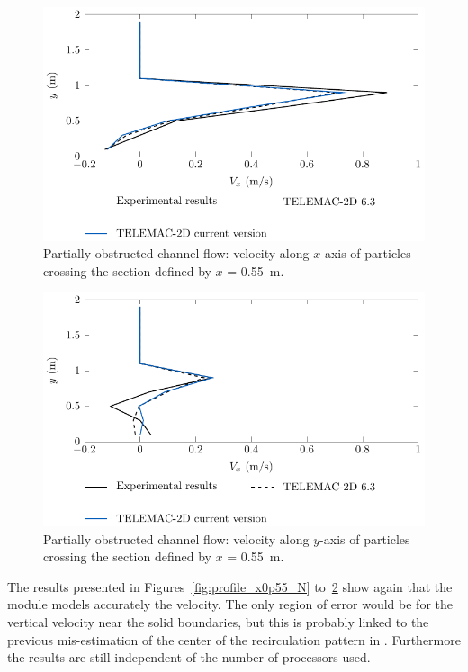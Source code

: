\begin{figure}[h!]
\begin{center}
  \includegraphics[]{./img/CanalAlgProfile_x0p55_Vx}
\end{center}
\caption{Partially obstructed channel flow: velocity along $x$-axis of particles crossing the section defined by $x$ = 0.55~m.}
\label{fig:profile_x0p55_V_X}
\end{figure}

\begin{figure}[h!]
\begin{center}
  \includegraphics[]{./img/CanalAlgProfile_x0p55_Vy}
\end{center}
\caption
{Partially obstructed channel flow: velocity along $y$-axis of particles crossing the section defined by $x$ = 0.55~m.}
\label{fig:profile_x0p55_V_Y}
\end{figure}

The results presented in Figures~\ref{fig:profile_x0p55_N}
to~\ref{fig:profile_x0p55_V_Y} show again that the module 
models accurately the velocity.
The only region of error would be for the vertical velocity near the solid
boundaries, but this is probably linked to the previous mis-estimation of the
center of the recirculation pattern in .
Furthermore the results are still independent of the number of processors used.

